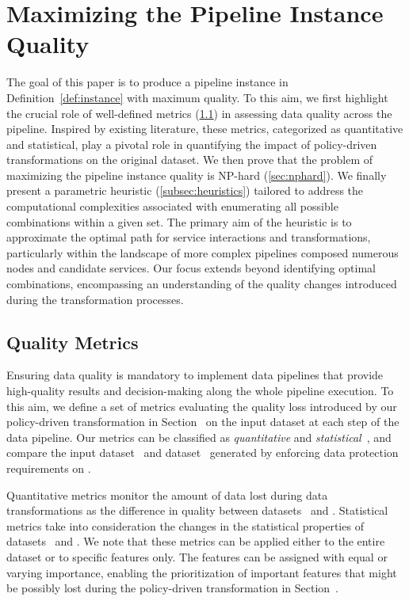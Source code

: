 \section{Maximizing the Pipeline Instance Quality}\label{sec:heuristics}
The goal of this paper is to produce a pipeline instance in Definition~\ref{def:instance} with maximum quality. To this aim, we first highlight the crucial role of well-defined metrics (\cref{sec:metrics}) in assessing data quality across the pipeline. Inspired by existing literature, these metrics, categorized as quantitative and statistical, play a pivotal role in quantifying the impact of policy-driven transformations on the original dataset.
We then prove that the problem of maximizing the pipeline instance quality is NP-hard (\cref{sec:nphard}). We finally present a parametric heuristic (\cref{subsec:heuristics}) tailored to address the computational complexities associated with enumerating all possible combinations within a given set. The primary aim of the heuristic is to approximate the optimal path for service interactions and transformations, particularly within the landscape of more complex pipelines composed numerous nodes and candidate services.
Our focus extends beyond identifying optimal combinations, encompassing an understanding of the quality changes introduced during the transformation processes.

\subsection{Quality Metrics}\label{sec:metrics}
Ensuring data quality is mandatory to implement data pipelines that provide high-quality results and decision-making along the whole pipeline execution. To this aim, we define a set of metrics evaluating the quality loss introduced by our policy-driven transformation in Section~\cite{ADD} on the input dataset \origdataset at each step of the data pipeline. Our metrics can be classified as \emph{quantitative} and \emph{statistical}~\cite{ADD}, and compare the input dataset \origdataset\ and dataset \transdataset\ generated by enforcing data protection requirements on \origdataset. 

Quantitative metrics monitor the amount of data lost during data transformations as the difference in quality between datasets \origdataset\ and \transdataset.
Statistical metrics take into consideration the changes in the statistical properties of datasets \origdataset\ and \transdataset. We note that these metrics can be applied either to the entire dataset or to specific features only. The features can be assigned with equal or varying importance, enabling the prioritization of important features that might be possibly lost during the policy-driven transformation in Section~\cite{ADD}.

